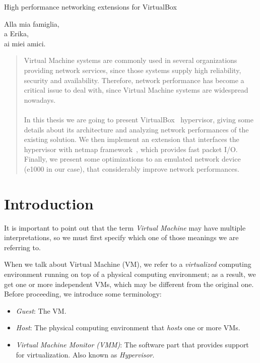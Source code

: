 \documentclass[a4paper, 12pt, titlepage]{report}
\newcommand{\emptypage}{\newpage\shipout\null}
\newenvironment{dedication}
  {\clearpage           %
   \thispagestyle{empty}%
   \vspace*{\stretch{1}}%
   \itshape             %
   \raggedleft          %
  }
  {\par %
   \vspace{\stretch{3}} %
   \clearpage           %
  }
\begin{document}
 \sloppy

\begin{titlepage}
High performance networking extensions for VirtualBox
\end{titlepage}

\emptypage

\begin{dedication}
Alla mia famiglia,\\
a Erika,\\
ai miei amici.
\end{dedication}

\begin{abstract}
Virtual Machine systems are commonly used in several organizations providing network services, since those systems supply high reliability, security and availability. Therefore, network performance has become a critical issue to deal with, since Virtual Machine systems are widespread nowadays.
\\
\\
In this thesis we are going to present VirtualBox~\cite{vbox} hypervisor, giving some details about its architecture and analyzing network performances of the existing solution. We then implement an extension that interfaces the hypervisor with netmap framework~\cite{netmap}, which provides fast packet I/O. Finally, we present some optimizations to an emulated network device (e1000 in our case), that considerably improve network performances.
\end{abstract}
\emptypage
\tableofcontents

\chapter{Introduction}

It is important to point out that the term \textit{Virtual Machine} may have multiple interpretations, so we must first specify which one of those meanings we are referring to.

When we talk about Virtual Machine (VM), we refer to a \textit{virtualized} computing environment running on top of a physical computing environment; as a result, we get one or more independent VMs, which may be different from the original one.\newline
Before proceeding, we introduce some terminology:
\begin{itemize}
\item \textit{Guest}: The VM.
\item \textit{Host}: The physical computing environment that \textit{hosts} one or more VMs.
\item \textit{Virtual Machine Monitor (VMM)}: The software part that provides support for virtualization. Also known as \textit{Hypervisor}.
\end{itemize}
\end{document}
